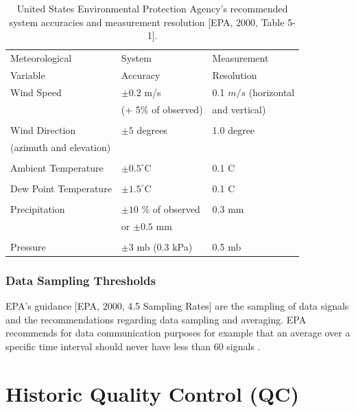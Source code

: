 \begin{table}[h!]
    \centering
    \begin{tabular}{l l l}
Meteorological	        &   System	                  & Measurement \\
Variable	            &   Accuracy                  &	 Resolution \\ \hline\hline
Wind Speed	            & $\pm{0.2}$ m/s              & 0.1 $m/s$ (horizontal\\
                        & (+ 5\% of observed)         & and vertical)\\
 & & \\
Wind Direction          & $\pm{5}$ degrees	          & 1.0 degree \\
(azimuth and elevation) &                             &  \\		
 & & \\
Ambient Temperature     & $\pm{0.5}^\circ$C	          & 0.1 C \\
 & & \\
Dew Point Temperature	& $\pm{1.5}^\circ$C	          & 0.1 C \\
 & & \\
Precipitation	        & $\pm{10}$ \% of observed    & 0.3 mm \\
                        & or $\pm{0.5}$ mm	          &  \\
 & & \\
Pressure	            & $\pm{3}$ mb (0.3 kPa)	      & 0.5 mb \\ \hline
    \end{tabular}
  \caption{United States Environmental Protection Agency's recommended system accuracies and measurement resolution [EPA, 2000, Table 5-1].}
 \label{tab:epa_table}
\end{table}

\subsubsection{Data Sampling Thresholds}

EPA's guidance [EPA, 2000, 4.5 Sampling Rates] are the sampling of data signals and the recommendations regarding data sampling and averaging. EPA recommends for data communication purposes for example that an average over a specific time interval should never have less than 60 signals .    


\section{Historic Quality Control (QC)} 

